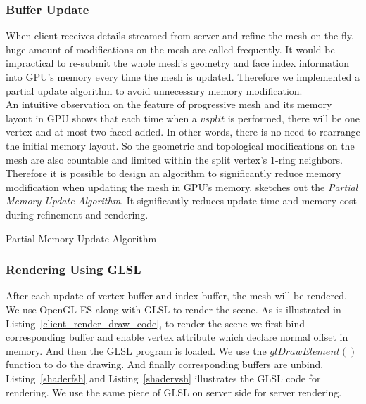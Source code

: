 \subsubsection{Buffer Update}
\label{section:bufferupdate}
When client receives details streamed from server and refine the mesh on-the-fly, huge amount of modifications on the mesh are called frequently. It would be impractical to re-submit the whole mesh's geometry and face index information into GPU's memory every time the mesh is updated. Therefore we implemented a partial update algorithm to avoid unnecessary memory modification. \\

An intuitive observation on the feature of progressive mesh and its memory layout in GPU shows that each time when a $vsplit$ is performed, there will be one vertex and at most two faced added. In other words, there is no need to rearrange the initial memory layout. So the geometric and topological modifications on the mesh are also countable and limited within the split vertex's 1-ring neighbors. Therefore it is possible to design an algorithm to significantly reduce memory modification when updating the mesh in GPU's memory.  sketches out the \emph{Partial Memory Update Algorithm}. It significantly reduces update time and memory cost during refinement and rendering. 

\begin{algorithm}                     
\caption{Partial Memory Update Algorithm}          
\label{partialMemUpdateAl}                           
\begin{algorithmic}      
	\ENDFOR
\end{algorithmic}
\end{algorithm}


\subsubsection{Rendering Using GLSL}
\label{section:renderglsl}
After each update of vertex buffer and index buffer, the mesh will be rendered. We use OpenGL ES along with GLSL to render the scene. As is illustrated in Listing~\ref{client_render_draw_code}, to render the scene we first bind corresponding buffer and enable vertex attribute which declare normal offset in memory. And then the GLSL program is loaded. We use the $glDrawElement()$ function to do the drawing. And finally corresponding buffers are unbind. Listing~\ref{shaderfsh} and Listing~\ref{shadervsh} illustrates the GLSL code for rendering. We use the same piece of GLSL on server side for server rendering. 





